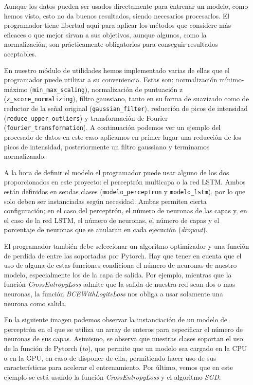 Aunque los datos pueden ser usados directamente para entrenar un modelo, como hemos visto, esto no da buenos resultados, siendo necesarios procesarlos. El programador tiene libertad aquí para aplicar los métodos que considere más eficaces o que mejor sirvan a sus objetivos, aunque algunos, como la normalización, son prácticamente obligatorios para conseguir resultados aceptables. 

En nuestro módulo de utilidades hemos implementado varias de ellas que el programador puede utilizar a su conveniencia. Estas son: normalización mínimo-máximo (\texttt{min\_max\_scaling}), normalización de puntuación z (\texttt{z\_score\_normalizing}), filtro gaussiano, tanto en su forma de suavizado como de reductor de la señal original (\texttt{gaussian\_filter}), reducción de picos de intensidad (\texttt{reduce\_upper\_outliers}) y transformación de Fourier (\texttt{fourier\_transformation}). A continuación podemos ver un ejemplo del procesado de datos en este caso aplicamos en primer lugar una reducción de los picos de intensidad, posteriormente un filtro gaussiano y terminamos normalizando.


A la hora de definir el modelo el programador puede usar alguno de los dos proporcionados en este proyecto: el perceptrón multicapa o la red LSTM. Ambos están definidos en sendas clases (\texttt{modelo\_perceptron} y \texttt{modelo\_lstm}), por lo que solo deben ser instanciadas según necesidad. Ambas permiten cierta configuración; en el caso del perceptrón, el número de neuronas de las capas y, en el caso de la red LSTM, el número de neuronas, el número de capas y el porcentaje de neuronas que se anularan en cada ejecución (\textit{dropout}). 

El programador también debe seleccionar un algoritmo optimizador y una función de perdida de entre las soportadas por Pytorch. Hay que tener en cuenta que el uso de alguna de estas funciones condiciona el número de neuronas de nuestro modelo, especialmente los de la capa de salida. Por ejemplo, mientras que la función \textit{CrossEntropyLoss} admite que la salida de nuestra red sean dos o mas neuronas, la función \textit{BCEWithLogitsLoss} nos obliga a usar solamente una neurona como salida.

En la siguiente imagen podemos observar la instanciación de un modelo de perceptrón en el que se utiliza un array de enteros para especificar el número de neuronas de sus capas. Asimismo, se observa que nuestras clases soportan el uso de la función de Pytorch (\textit{to}), que permite que un modelo sea cargado en la CPU o en la GPU, en caso de disponer de ella, permitiendo hacer uso de sus características para acelerar el entrenamiento. Por último, vemos que en este ejemplo se está usando la función \textit{CrossEntropyLoss} y el algoritmo \textit{SGD}.

